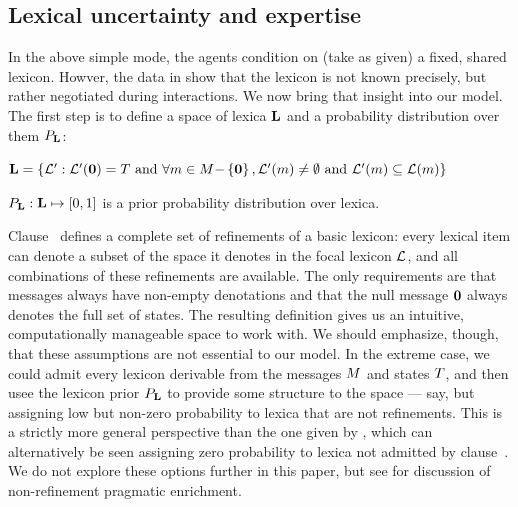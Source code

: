 \documentclass{article}
\begin{document}

\subsection{Lexical uncertainty and expertise}\label{sec:full}

In the above simple mode, the agents condition on (take as given) a
fixed, shared lexicon. Howver, the data in  show that
the lexicon is not known precisely, but rather negotiated during
interactions. We now bring that insight into our model. The first step
is to define a space of lexica $\mathbf{L}$ and a probability
distribution over them $P_{\mathbf{L}}$:
%
\begin{examples}
\item\label{model-extend}
  \begin{examples} 
  \item\label{lexset}%
      $\mathbf{L} = \left\{ \mathcal{L}' : \mathcal{L}'(\mathbf{0}) = T \text{ and } 
      \forall m \in M{-}\left\{ \mathbf{0} \right\}, 
      \mathcal{L}'(m) \neq \emptyset \text{ and } 
      \mathcal{L}'(m) \subseteq \mathcal{L}(m) \right\}$
  \item\label{LexPrior}%
    $P_{\mathbf{L}} : \mathbf{L} \mapsto [0,1]$ is a prior
    probability distribution over lexica.  
  \end{examples}
\end{examples}
%
Clause~ defines a complete set of
refinements of a basic lexicon: every lexical item can denote a subset
of the space it denotes in the focal lexicon $\mathcal{L}$, and all
combinations of these refinements are available. The only requirements
are that messages always have non-empty denotations and that the null
message $\mathbf{0}$ always denotes the full set of states. The
resulting definition gives us an intuitive, computationally manageable
space to work with. We should emphasize, though, that these
assumptions are not essential to our model. In the extreme case, we
could admit every lexicon derivable from the messages $M$ and
states $T$, and then usee the lexicon prior $P_{\mathbf{L}}$ to
provide some structure to the space --- say, but assigning low but
non-zero probability to lexica that are not refinements. This is a
strictly more general perspective than the one given by
, which can alternatively be seen assigning zero
probability to lexica not admitted by
clause~. We do not explore these options
further in this paper, but see for discussion of non-refinement
pragmatic enrichment.
\end{document}
